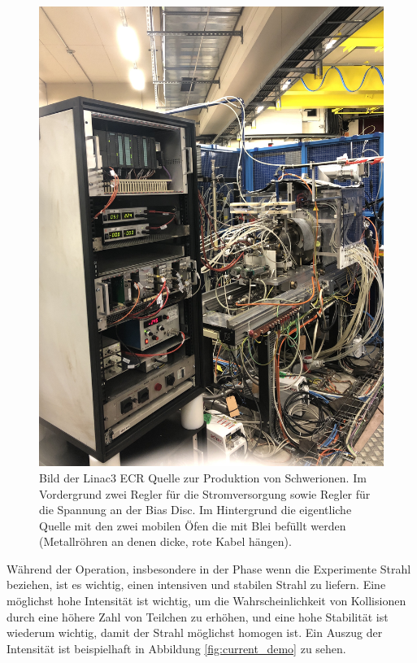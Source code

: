 \documentclass[11pt, a4paper, titlepage, headings=standardclasses]{scrartcl}
\begin{document}
\begin{figure}
    \centering
    \includegraphics[width=1\textwidth]{gts.jpg}
    \caption{Bild der Linac3 ECR Quelle zur Produktion von Schwerionen. Im Vordergrund zwei Regler für die Stromversorgung sowie Regler für die Spannung an der Bias Disc. Im Hintergrund die eigentliche Quelle mit den zwei mobilen Öfen die mit Blei befüllt werden (Metallröhren an denen dicke, rote Kabel hängen). }
    \label{fig:gts}
\end{figure}

Während der Operation, insbesondere in der Phase wenn die Experimente Strahl beziehen, ist es wichtig, einen intensiven und stabilen Strahl zu liefern. Eine möglichst hohe Intensität ist wichtig, um die Wahrscheinlichkeit von Kollisionen durch eine höhere Zahl von Teilchen zu erhöhen, und eine hohe Stabilität ist wiederum wichtig, damit der Strahl möglichst homogen ist. Ein Auszug der Intensität ist beispielhaft in Abbildung \ref{fig:current_demo} zu sehen.
\end{document}
